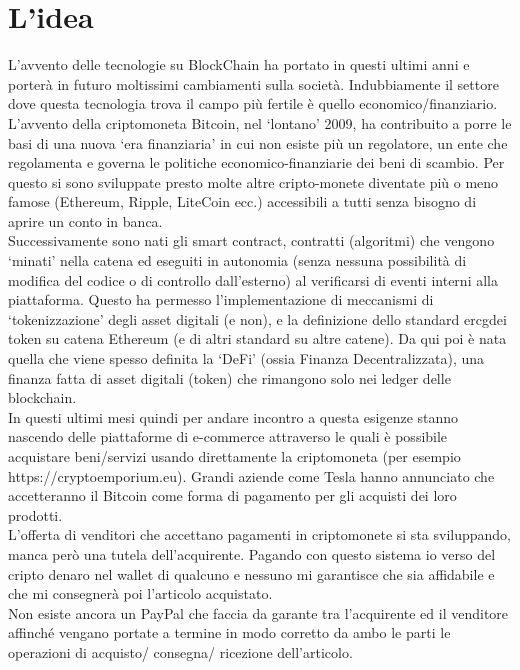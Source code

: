 \section{L'idea}
L’avvento delle tecnologie su BlockChain ha portato in questi ultimi anni e porterà in futuro moltissimi cambiamenti sulla società. Indubbiamente il settore dove questa tecnologia trova il campo più fertile è quello economico/finanziario. L’avvento della criptomoneta Bitcoin, nel ‘lontano’ 2009, ha contribuito a porre le basi di una nuova ‘era finanziaria’ in cui non esiste più un regolatore, un ente che regolamenta e governa le politiche economico-finanziarie dei beni di scambio. Per questo si sono sviluppate presto molte altre cripto-monete diventate più o meno famose (Ethereum, Ripple, LiteCoin ecc.) accessibili a tutti senza bisogno di aprire un conto in banca.\\
Successivamente sono nati gli smart contract, contratti (algoritmi) che vengono ‘minati’ nella catena ed eseguiti in autonomia (senza nessuna possibilità di modifica del codice o di controllo dall’esterno) al verificarsi di eventi interni alla piattaforma. Questo ha permesso l’implementazione di meccanismi di ‘tokenizzazione’ degli asset digitali (e non), e la definizione dello standard \gls{ercg}\glsfirstoccur  dei token su catena Ethereum (e di altri standard su altre catene). Da qui poi è nata quella che viene spesso definita la ‘DeFi’ (ossia Finanza Decentralizzata), una finanza fatta di asset digitali (token) che rimangono solo nei ledger delle blockchain.\\
In questi ultimi mesi quindi per andare incontro a questa esigenze stanno nascendo delle piattaforme di e-commerce attraverso le quali è possibile acquistare beni/servizi usando direttamente la criptomoneta (per esempio https://cryptoemporium.eu). Grandi aziende come Tesla hanno annunciato che accetteranno il Bitcoin come forma di pagamento per gli acquisti dei loro prodotti.\\
L’offerta di venditori che accettano pagamenti in criptomonete si sta sviluppando, manca però una tutela dell’acquirente. Pagando con questo sistema io verso del cripto denaro nel wallet di qualcuno e nessuno mi garantisce che sia affidabile e che mi consegnerà poi l’articolo acquistato.\\
Non esiste ancora un PayPal che faccia da garante tra l’acquirente ed il venditore affinché vengano portate a termine in modo corretto da ambo le parti le operazioni di acquisto/ consegna/ ricezione dell’articolo.\\

